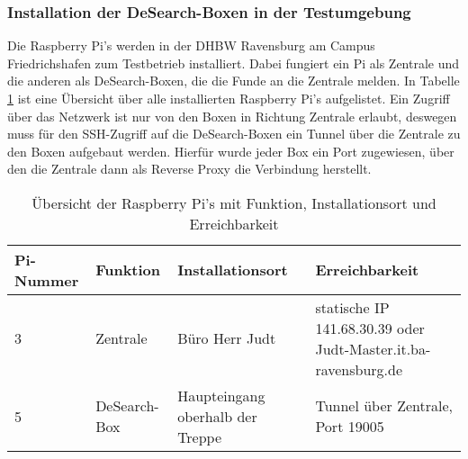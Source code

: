 \subsubsection{Installation der DeSearch-Boxen in der Testumgebung}
Die Raspberry Pi's werden in der DHBW Ravensburg am Campus Friedrichshafen zum Testbetrieb installiert. Dabei fungiert ein Pi als Zentrale und die anderen als DeSearch-Boxen, die die Funde an die Zentrale melden. In Tabelle \ref{tab:pis} ist eine Übersicht über alle installierten Raspberry Pi's aufgelistet. Ein Zugriff über das Netzwerk ist nur von den Boxen in Richtung Zentrale erlaubt, deswegen muss für den SSH-Zugriff auf die DeSearch-Boxen ein Tunnel über die Zentrale zu den Boxen aufgebaut werden. Hierfür wurde jeder Box ein Port zugewiesen, über den die Zentrale dann als Reverse Proxy die Verbindung herstellt.
\begin{table}[h]
	\begin{tabular}{ | p{} | p{} | p{4cm} | p{6cm} |}
		\hline
		\textbf{Pi-Nummer} & \textbf{Funktion} & \textbf{Installationsort} &  \textbf{Erreichbarkeit} \\ \hline
		3 & Zentrale & Büro Herr Judt & statische IP 141.68.30.39 oder \mbox{Judt-Master.it.ba-ravensburg.de} \\ \hline
		5 & DeSearch-Box & Haupteingang oberhalb der Treppe & Tunnel über Zentrale, Port 19005 \\ \hline
		
	\end{tabular}
	\caption{Übersicht der Raspberry Pi's mit Funktion, Installationsort und Erreichbarkeit}
	\label{tab:pis}
	
\end{table}
